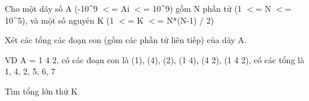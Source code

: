 Cho một dãy số A (-10\textasciicircum9 $<$= Ai $<$= 10\textasciicircum9) gồm N phần tử (1 $<$= N $<$= 10\textasciicircum5), và một số nguyên K (1 $<$= K $<$= N*(N-1) / 2)

Xét các tổng các đoạn con (gồm các phần tử liên tiếp) của dãy A.

VD A = 1 4 2, có các đoạn con là (1), (4), (2), (1 4), (4 2), (1 4 2), có các tổng là 1, 4, 2, 5, 6, 7

Tìm tổng lớn thứ K